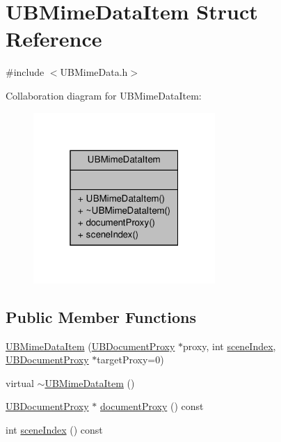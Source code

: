 \hypertarget{struct_u_b_mime_data_item}{\section{U\-B\-Mime\-Data\-Item Struct Reference}
\label{da/dba/struct_u_b_mime_data_item}
}


{\ttfamily \#include $<$U\-B\-Mime\-Data.\-h$>$}



Collaboration diagram for U\-B\-Mime\-Data\-Item\-:
\nopagebreak
\begin{figure}[H]
\begin{center}
\leavevmode
\includegraphics[width=196pt]{de/de7/struct_u_b_mime_data_item__coll__graph}
\end{center}
\end{figure}
\subsection*{Public Member Functions}
\begin{DoxyCompactItemize}
\item 
\hyperlink{struct_u_b_mime_data_item_a4c73b9bcfee2addad5874563154ef90c}{U\-B\-Mime\-Data\-Item} (\hyperlink{class_u_b_document_proxy}{U\-B\-Document\-Proxy} $\ast$proxy, int \hyperlink{struct_u_b_mime_data_item_a1c596d4dd198c6c454b40a4ad10cf7fd}{scene\-Index}, \hyperlink{class_u_b_document_proxy}{U\-B\-Document\-Proxy} $\ast$target\-Proxy=0)
\item 
virtual \hyperlink{struct_u_b_mime_data_item_ab796bfdf114d7e05d185bd3ba00e13f8}{$\sim$\-U\-B\-Mime\-Data\-Item} ()
\item 
\hyperlink{class_u_b_document_proxy}{U\-B\-Document\-Proxy} $\ast$ \hyperlink{struct_u_b_mime_data_item_af9a2e323ca859f1313a79a048327de7a}{document\-Proxy} () const 
\item 
int \hyperlink{struct_u_b_mime_data_item_a1c596d4dd198c6c454b40a4ad10cf7fd}{scene\-Index} () const 
\end{DoxyCompactItemize}


